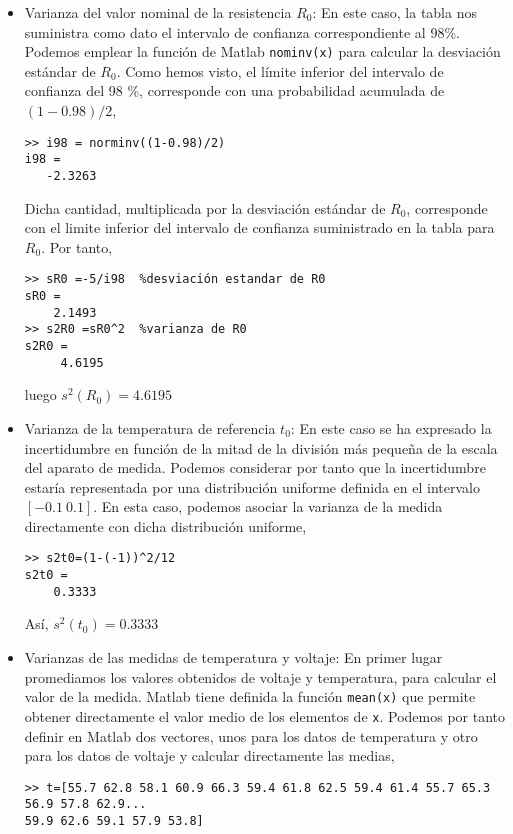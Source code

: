 \begin{itemize} 

\item Varianza del valor nominal de la resistencia $R_0$: En este caso, la tabla nos suministra como dato el intervalo de confianza correspondiente al 98\%.  Podemos emplear la función de Matlab \texttt{nominv(x)} para calcular la desviación estándar de $R_0$. Como hemos visto, el límite inferior del intervalo de confianza del 98 \%, corresponde con una probabilidad acumulada de $(1-0.98)/2$,
\begin{verbatim}
>> i98 = norminv((1-0.98)/2)
i98 =
   -2.3263
\end{verbatim} 

Dicha cantidad, multiplicada por la desviación estándar de $R_0$, corresponde con el limite inferior del intervalo de confianza suministrado en la tabla  para $R_0$. Por tanto,

\begin{verbatim}
>> sR0 =-5/i98  %desviación estandar de R0
sR0 =
    2.1493
>> s2R0 =sR0^2  %varianza de R0
s2R0 =
     4.6195
\end{verbatim}

luego $s^2(R_0)= 4.6195$

\item Varianza de la temperatura de referencia $t_0$: En este caso se ha expresado la incertidumbre en función de la mitad de la división más pequeña de la escala del aparato de medida. Podemos considerar por tanto que la incertidumbre estaría representada por una distribución uniforme definida en el intervalo $[-0.1\ 0.1]$. En esta caso, podemos asociar la varianza de la medida directamente con dicha distribución uniforme, 

\begin{verbatim}
>> s2t0=(1-(-1))^2/12
s2t0 =
    0.3333
\end{verbatim}

Así, $s^2(t_0)=0.3333$

\item Varianzas de las medidas de temperatura y voltaje:
En primer lugar promediamos los valores  obtenidos de voltaje y temperatura, para calcular el valor de la medida. Matlab tiene definida la función \texttt{mean(x)} que permite obtener directamente el valor medio de los elementos de \texttt{x}. Podemos por tanto definir en Matlab dos vectores, unos para los datos de temperatura y otro para los datos de voltaje y calcular directamente las medias,

\begin{verbatim}
>> t=[55.7 62.8 58.1 60.9 66.3 59.4 61.8 62.5 59.4 61.4 55.7 65.3 56.9 57.8 62.9...
59.9 62.6 59.1 57.9 53.8]


\end{verbatim}
\end{itemize}
